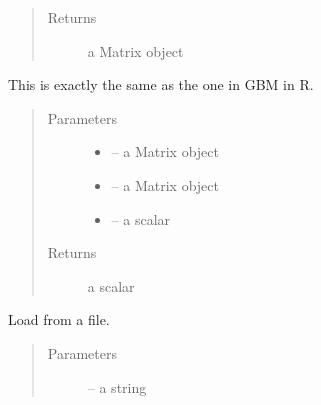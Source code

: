 \documentclass[letterpaper,10pt,english]{sphinxmanual}
\begin{document}
\begin{fulllineitems}
\begin{fulllineitems}
\begin{quote}
\begin{description}
\begin{itemize}
\end{itemize}

\item[{Returns}] \leavevmode
a Matrix object

\end{description}\end{quote}

\end{fulllineitems}


\begin{fulllineitems}
\label{\detokenize{index:dbm_py.interface.DBM.interact}}
This is exactly the same as the one in GBM in R.
\begin{quote}\begin{description}
\item[{Parameters}] \leavevmode\begin{itemize}
\item {} 
 -- a Matrix object

\item {} 
 -- a Matrix object

\item {} 
 -- a scalar

\end{itemize}

\item[{Returns}] \leavevmode
a scalar

\end{description}\end{quote}

\end{fulllineitems}


\begin{fulllineitems}
\label{\detokenize{index:dbm_py.interface.DBM.load}}
Load from a file.
\begin{quote}\begin{description}
\item[{Parameters}] \leavevmode
{} -- a string

\end{description}\end{quote}


\end{fulllineitems}
\end{fulllineitems}
\end{document}

